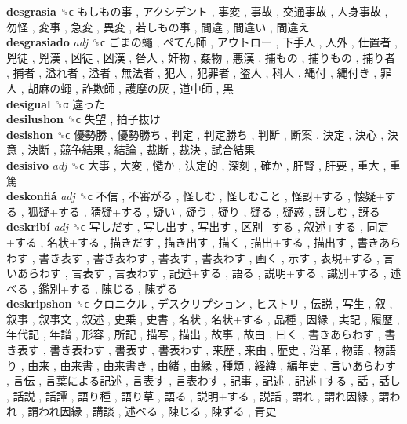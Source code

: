 \textbf{desgrasia} ␝ϲ   もしもの事 ,  アクシデント ,  事変 ,  事故 ,  交通事故 ,  人身事故 ,  勿怪 ,  変事 ,  急変 ,  異変 ,  若しもの事 ,  間違 ,  間違い ,  間違え   \\
\textbf{desgrasiado} \emph{adj}  ␝ϲ   ごまの蠅 ,  ぺてん師 ,  アウトロー ,  下手人 ,  人外 ,  仕置者 ,  兇徒 ,  兇漢 ,  凶徒 ,  凶漢 ,  咎人 ,  奸物 ,  姦物 ,  悪漢 ,  捕もの ,  捕りもの ,  捕り者 ,  捕者 ,  溢れ者 ,  溢者 ,  無法者 ,  犯人 ,  犯罪者 ,  盗人 ,  科人 ,  縄付 ,  縄付き ,  罪人 ,  胡麻の蠅 ,  詐欺師 ,  護摩の灰 ,  道中師 ,  黒   \\
\textbf{desigual} ␝α   違った   \\
\textbf{desilushon} ␝ϲ   失望 ,  拍子抜け   \\
\textbf{desishon} ␝ϲ   優勢勝 ,  優勢勝ち ,  判定 ,  判定勝ち ,  判断 ,  断案 ,  決定 ,  決心 ,  決意 ,  決断 ,  競争結果 ,  結論 ,  裁断 ,  裁決 ,  試合結果   \\
\textbf{desisivo} \emph{adj}  ␝ϲ   大事 ,  大変 ,  慥か ,  決定的 ,  深刻 ,  確か ,  肝腎 ,  肝要 ,  重大 ,  重篤   \\
\textbf{deskonfiá} \emph{adj}  ␝ϲ   不信 ,  不審がる ,  怪しむ ,  怪しむこと ,  怪訝+する ,  懐疑+する ,  狐疑+する ,  猜疑+する ,  疑い ,  疑う ,  疑り ,  疑る ,  疑惑 ,  訝しむ ,  訝る   \\
\textbf{deskribí} \emph{adj}  ␝ϲ   写しだす ,  写し出す ,  写出す ,  区別+する ,  叙述+する ,  同定+する ,  名状+する ,  描きだす ,  描き出す ,  描く ,  描出+する ,  描出す ,  書きあらわす ,  書き表す ,  書き表わす ,  書表す ,  書表わす ,  画く ,  示す ,  表現+する ,  言いあらわす ,  言表す ,  言表わす ,  記述+する ,  語る ,  説明+する ,  識別+する ,  述べる ,  鑑別+する ,  陳じる ,  陳ずる   \\
\textbf{deskripshon} ␝ϲ   クロニクル ,  デスクリプション ,  ヒストリ ,  伝説 ,  写生 ,  叙 ,  叙事 ,  叙事文 ,  叙述 ,  史乗 ,  史書 ,  名状 ,  名状+する ,  品種 ,  因縁 ,  実記 ,  履歴 ,  年代記 ,  年譜 ,  形容 ,  所記 ,  描写 ,  描出 ,  故事 ,  故由 ,  曰く ,  書きあらわす ,  書き表す ,  書き表わす ,  書表す ,  書表わす ,  来歴 ,  来由 ,  歴史 ,  沿革 ,  物語 ,  物語り ,  由来 ,  由来書 ,  由来書き ,  由緒 ,  由縁 ,  種類 ,  経緯 ,  編年史 ,  言いあらわす ,  言伝 ,  言葉による記述 ,  言表す ,  言表わす ,  記事 ,  記述 ,  記述+する ,  話 ,  話し ,  話説 ,  話譚 ,  語り種 ,  語り草 ,  語る ,  説明+する ,  説話 ,  謂れ ,  謂れ因縁 ,  謂われ ,  謂われ因縁 ,  講談 ,  述べる ,  陳じる ,  陳ずる ,  青史   \\
